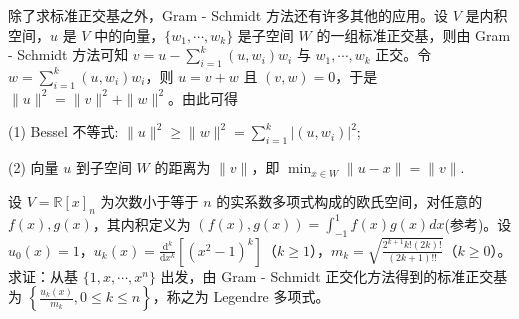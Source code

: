 \documentclass[../../main.tex]{subfiles}
\begin{document}
除了求标准正交基之外，Gram - Schmidt 方法还有许多其他的应用。设 $V$ 是内积空间，$u$ 是 $V$ 中的向量，$\{w_1,\cdots,w_k\}$ 是子空间 $W$ 的一组标准正交基，则由 Gram - Schmidt 方法可知 $v = u - \sum_{i = 1}^{k}(u,w_i)w_i$ 与 $w_1,\cdots,w_k$ 正交。令 $w = \sum_{i = 1}^{k}(u,w_i)w_i$，则 $u = v + w$ 且 $(v,w) = 0$，于是 $\|u\|^2 = \|v\|^2 + \|w\|^2$。由此可得

(1) Bessel 不等式: $\|u\|^2\geq\|w\|^2 = \sum_{i = 1}^{k}|(u,w_i)|^2$;

(2) 向量 $u$ 到子空间 $W$ 的距离为 $\|v\|$，即 $\min_{x\in W}\|u - x\| = \|v\|$. 

\begin{example}\label{example:例9.11}
设 $V = \mathbb{R}[x]_n$ 为次数小于等于 $n$ 的实系数多项式构成的欧氏空间，对任意的 $f(x),g(x)$，其内积定义为 $(f(x),g(x)) = \int_{-1}^{1}f(x)g(x)dx$(参考)。设 $u_0(x)=1$，$u_k(x)=\frac{\mathrm{d}^k}{\mathrm{d}x^k}[(x^2 - 1)^k]$（$k\geq1$），$m_k = \sqrt{\frac{2^{k + 1}k!(2k)!}{(2k + 1)!!}}$（$k\geq0$）。求证：从基 $\{1,x,\cdots,x^n\}$ 出发，由 Gram - Schmidt 正交化方法得到的标准正交基为 $\left\{\frac{u_k(x)}{m_k},0\leq k\leq n\right\}$，称之为 Legendre 多项式。
\end{example}
\end{document}
